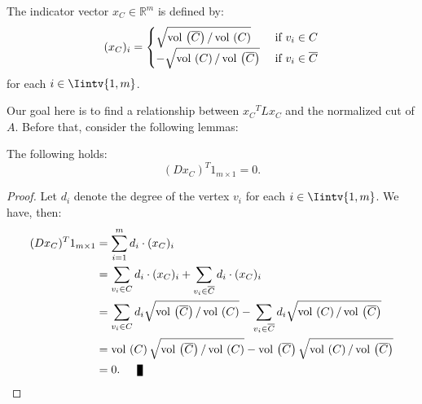 \begin{definition}
The indicator vector $x_C \in \mathbb R ^{m }$ is defined by:
   \begin{equation} \label{indicator}
   (x_C)_i =
   \begin{cases}
      \sqrt{ \operatorname*{vol\,}  \left( \overline C \right) / \operatorname*{vol\,} \left( C \right) } &\text{ if } v_i \in C \\
      -\sqrt{\operatorname*{vol\,} \left( C \right) / \operatorname*{vol\,} \left( \overline C \right)} & \text{ if } v_i \in \overline C 
   \end{cases}
\end{equation}
for each $i \in \Iintv{1,m}$.
\end{definition}

Our goal here is to find a relationship between ${x_C}^T L x_C$ and the normalized cut of $A$.
Before that, consider the following lemmas:

\begin{lemma} \label{cond1}
   The following holds:
   \begin{equation}
      (D x_C)^T 1_{m \times 1} = 0.
   \end{equation}
\end{lemma}
\begin{proof}
   Let $d_i$ denote the degree of the vertex $v_i$ for each $i \in \Iintv{1,m}$. We have, then:
   \begin{equation*}
      \begin{split}
         (D x_C)^T 1_{m \times 1} &= \sum_{i=1}^m d_i \cdot (x_C)_i \\
         &= \sum_{v_i \in C} d_i \cdot (x_C)_i + \sum_{v_i \in \overline C} d_i \cdot (x_C)_i \\
         &= \sum_{v_i \in C} d_i \sqrt{\vol \left( \overline C \right) / \vol \left( C \right) } - \sum_{v_i \in \overline C} d_i \sqrt{\vol \left( C \right) / \vol \left( \overline C \right) } \\
         &= \vol \left( C \right) \sqrt{\vol \left( \overline C \right) / \vol \left( C \right) } - \vol \left( \overline C \right) \sqrt{\vol \left( C \right) / \vol \left( \overline C \right) } \\
         &= 0. \qed
      \end{split}
   \end{equation*}
\end{proof}

